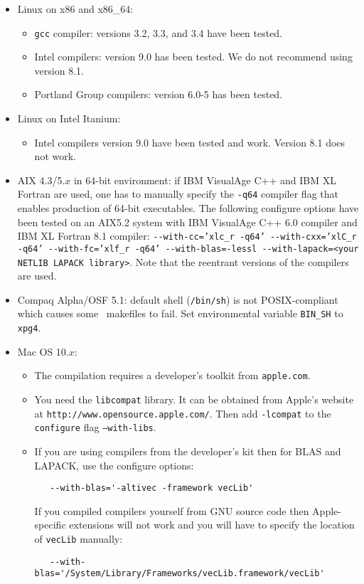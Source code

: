 \documentclass[12pt]{article}
\begin{document}
\begin{itemize}

\item Linux on x86 and x86\_64:
  \begin{itemize}
   \item {\tt gcc} compiler: versions 3.2, 3.3, and 3.4 have been tested.
   \item Intel compilers: version 9.0 has been tested. We do not recommend
   using version 8.1.
   \item Portland Group compilers: version 6.0-5 has been tested.
  \end{itemize}

\item Linux on Intel Itanium:
  \begin{itemize}
   \item Intel compilers version 9.0 have been tested and work. Version 8.1
   does not work.
  \end{itemize}

\item AIX 4.3/5.$x$ in 64-bit environment:
if IBM VisualAge C++ and IBM XL Fortran are used,
one has to manually specify
the {\tt -q64} compiler flag
that enables production of 64-bit executables.
The following configure options have been tested on an AIX5.2
system with IBM VisualAge C++ 6.0 compiler and IBM XL Fortran 8.1 compiler:
{\tt -}{\tt -with-cc='xlc\_r -q64' -}{\tt -with-cxx='xlC\_r -q64'
 -}{\tt -with-fc='xlf\_r -q64' -}{\tt -with-blas=-lessl
 -}{\tt -with-lapack=<your NETLIB LAPACK library>}. Note that
the reentrant versions of the compilers
are used.

\item Compaq Alpha/OSF 5.1: default shell ({\tt /bin/sh})
is not POSIX-compliant which causes some \PSIthree\ makefiles
to fail. Set environmental variable {\tt BIN\_SH} to {\tt xpg4}.

\item Mac OS 10.$x$:

  \begin{itemize}
   \item The compilation requires a developer's toolkit from {\tt apple.com}.

   \item You need the {\tt libcompat} library. It can be obtained from Apple's 
   website at {\tt http://www.opensource.apple.com/}. Then add {\tt -lcompat} to the
   {\tt configure} flag {\tt --with-libs}.

   \item If you are using compilers from the developer's kit then for
   BLAS and LAPACK, use the configure options:
   \begin{verbatim}
   --with-blas='-altivec -framework vecLib'
   \end{verbatim}
   If you compiled compilers yourself from GNU source code then
   Apple-specific extensions will not work and you will have to specify
   the location of {\tt vecLib} manually:
   \begin{verbatim}
   --with-blas='/System/Library/Frameworks/vecLib.framework/vecLib'
   \end{verbatim}


\end{itemize}
\end{itemize}
\end{document}

